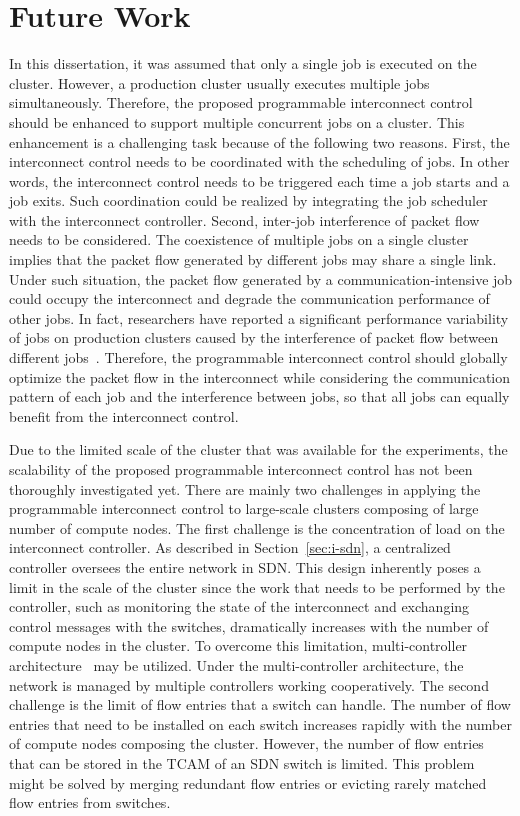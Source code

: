 \section{Future Work}

In this dissertation, it was assumed that only a single job is executed on the
cluster. However, a production cluster usually executes multiple jobs
simultaneously. Therefore, the proposed programmable interconnect control
should be enhanced to support multiple concurrent jobs on a cluster. This
enhancement is a challenging task because of the following two reasons. First,
the interconnect control needs to be coordinated with the scheduling of jobs.
In other words, the interconnect control needs to be triggered each time a job
starts and a job exits. Such coordination could be realized by integrating the
job scheduler with the interconnect controller. Second, inter-job interference
of packet flow needs to be considered. The coexistence of multiple jobs on a
single cluster implies that the packet flow generated by different jobs may
share a single link. Under such situation, the packet flow generated by a
communication-intensive job could occupy the interconnect and degrade the
communication performance of other jobs. In fact, researchers have reported a
significant performance variability of jobs on production clusters caused by
the interference of packet flow between different jobs~\cite{Bhatele2013}.
Therefore, the programmable interconnect control should globally optimize the
packet flow in the interconnect while considering the communication pattern of
each job and the interference between jobs, so that all jobs can equally
benefit from the interconnect control.

Due to the limited scale of the cluster that was available for the
experiments, the scalability of the proposed programmable interconnect control
has not been thoroughly investigated yet. There are mainly two challenges in
applying the programmable interconnect control to large-scale clusters
composing of large number of compute nodes. The first challenge is the
concentration of load on the interconnect controller. As described in
Section~\ref{sec:i-sdn}, a centralized controller oversees the entire network
in SDN\@. This design inherently poses a limit in the scale of the cluster
since the work that needs to be performed by the controller, such as
monitoring the state of the interconnect and exchanging control messages with
the switches, dramatically increases with the number of compute nodes in the
cluster. To overcome this limitation, multi-controller
architecture~\cite{Hu2018} may be utilized. Under the multi-controller
architecture, the network is managed by multiple controllers working
cooperatively. The second challenge is the limit of flow entries that a switch
can handle. The number of flow entries that need to be installed on each
switch increases rapidly with the number of compute nodes composing the
cluster.  However, the number of flow entries that can be stored in the TCAM
of an SDN switch is limited. This problem might be solved by merging redundant
flow entries or evicting rarely matched flow entries from switches.
